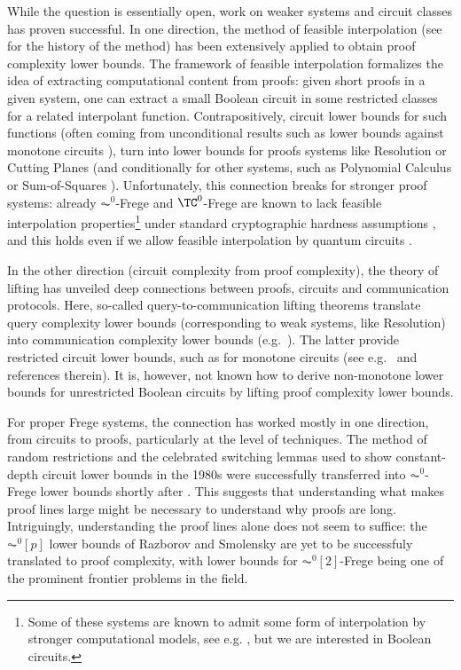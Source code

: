 \documentclass[11pt]{article}
\theoremstyle{definition}
\theoremstyle{plain}
\theoremstyle{remark}
\begin{document}
While the question is essentially open, work on weaker systems and circuit classes has proven successful. In one direction, the method of feasible interpolation \cite{Kra94-PHP, Razb95, Kra97} (see \cite[§17.9.1]{krajicekBOOK} for the history of the method) has been extensively applied to obtain proof complexity lower bounds. The framework of feasible interpolation formalizes the idea of extracting computational content from proofs: given short proofs in a given system, one can extract a small Boolean circuit in some restricted classes for a related interpolant function. Contrapositively, circuit lower bounds for such functions (often coming from unconditional results such as lower bounds against monotone circuits \cite{Razb85, And85, AB87}), turn into lower bounds for proofs systems like Resolution \cite{Kra97} or Cutting Planes \cite{Pud97} (and conditionally for other systems, such as Polynomial Calculus or Sum-of-Squares \cite{Hak20}). Unfortunately, this connection breaks for stronger proof systems: already $\AC^0$-Frege and $\TC^0$-Frege are known to lack feasible interpolation properties\footnote{Some of these systems are known to admit some form of interpolation by stronger computational models, see e.g. \cite{Pud20, DR23}, but we are interested in Boolean circuits.} under standard cryptographic hardness assumptions \cite{KP98, BPR1997, BDGMP04}, and this holds even if we allow feasible interpolation by quantum circuits \cite{ ACG24}.

In the other direction (circuit complexity from proof complexity), the theory of lifting has unveiled deep connections between proofs, circuits and communication protocols. Here, so-called query-to-communication lifting theorems translate query complexity lower bounds (corresponding to weak systems, like Resolution) into communication complexity lower bounds (e.g.\ \cite{RMK97, LMMPZ22}). The latter provide restricted circuit lower bounds, such as for monotone circuits (see e.g.\ \cite{GGKS18, dRMNPRV20, dRGR22} and references therein). It is, however, not known how to derive non-monotone lower bounds for unrestricted Boolean circuits by lifting proof complexity lower bounds.

For proper Frege systems, the connection has worked mostly in one direction, from circuits to proofs, particularly at the level of techniques. The method of random restrictions and the celebrated switching lemmas used to show constant-depth circuit lower bounds in the 1980s \cite{FSS-AC0, Ajt83, Has86} were successfully transferred into $\AC^0$-Frege lower bounds shortly after \cite{Ajt94-PHP, BPU92-PHP,  Kra94-PHP,  jointPHP, PBI93, KPW95-AC0}. This suggests that understanding what makes proof lines large might be necessary to understand why proofs are long. Intriguingly, understanding the proof lines alone does not seem to suffice: the $\AC^0[p]$ lower bounds of Razborov and Smolensky \cite{Razb87, Smo87} are yet to be successfuly translated to proof complexity, with lower bounds for $\AC^0[2]$-Frege being one of the prominent frontier problems in the field.
\end{document}
